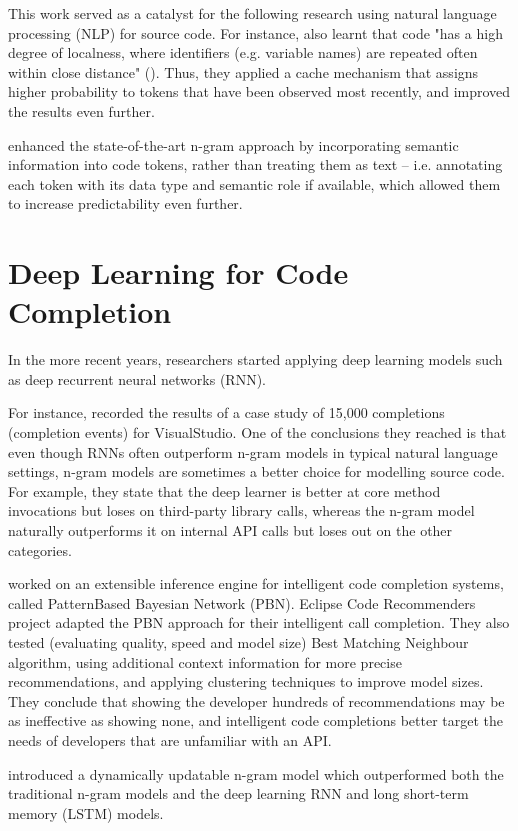 This work served as a catalyst for the following research using natural language processing (NLP) for source code. For instance, \cite{Tu14a} also learnt that code "has a high degree of localness, where identifiers (e.g. variable names) are repeated often within close distance" (\cite{Alla18a}). Thus, they applied a cache mechanism that assigns higher probability to tokens that have been observed most recently, and improved the results even further.

\cite{Nguy13a} enhanced the state-of-the-art n-gram approach by incorporating semantic information into code tokens, rather than treating them as text -- i.e. annotating each token with its data type and semantic role if available, which allowed them to increase predictability even further.

\section{Deep Learning for Code Completion}
\label{sec:RelatedWorks-DeepLearning}
In the more recent years, researchers started applying deep learning models such as deep recurrent neural networks (RNN).

For instance, \cite{Hell19a} recorded the results of a case study of 15,000 completions (completion events) for VisualStudio. One of the conclusions they reached is that even though RNNs often outperform n-gram models in typical natural language settings, n-gram models are sometimes a better choice for modelling source code. For example, they state that the deep learner is better at core method invocations but loses on third-party library calls, whereas the n-gram model naturally outperforms it on internal API calls but loses out on the other categories.

\cite{Prok15a} worked on an extensible inference engine for intelligent code completion systems, called PatternBased Bayesian Network (PBN). Eclipse Code Recommenders project adapted the PBN approach for their intelligent call completion. They also tested (evaluating quality, speed and model size) Best Matching Neighbour algorithm, using additional context information for more precise recommendations, and applying clustering techniques to improve model sizes. They conclude that showing the developer hundreds of recommendations may be as ineffective as showing none, and intelligent code completions better target the needs of developers that are unfamiliar with an API.

\cite{Hell17a} introduced a dynamically updatable n-gram model which outperformed both the traditional n-gram models and the deep learning RNN and long short-term memory (LSTM) models.

